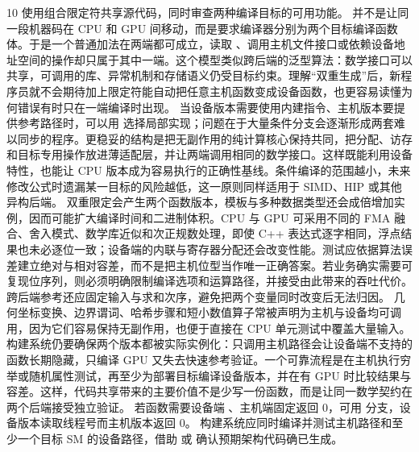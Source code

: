 \begin{solutionexercise}{10}
\conclusionheading 使用组合限定符共享源代码，同时审查两种编译目标的可用功能。
\discussionheading
{}
 并不是让同一段机器码在 CPU 和 GPU 间移动，而是要求编译器分别为两个目标编译函数体。于是一个普通加法在两端都可成立，读取 、调用主机文件接口或依赖设备地址空间的操作却只属于其中一端。这个模型类似跨后端的泛型算法：数学接口可以共享，可调用的库、异常机制和存储语义仍受目标约束。理解“双重生成”后，新程序员就不会期待加上限定符能自动把任意主机函数变成设备函数，也更容易读懂为何错误有时只在一端编译时出现。
当设备版本需要使用内建指令、主机版本要提供参考路径时，可以用  选择局部实现；问题在于大量条件分支会逐渐形成两套难以同步的程序。更稳妥的结构是把无副作用的纯计算核心保持共同，把分配、访存和目标专用操作放进薄适配层，并让两端调用相同的数学接口。这样既能利用设备特性，也能让 CPU 版本成为容易执行的正确性基线。条件编译的范围越小，未来修改公式时遗漏某一目标的风险越低，这一原则同样适用于 SIMD、HIP 或其他异构后端。
双重限定会产生两个函数版本，模板与多种数据类型还会成倍增加实例，因而可能扩大编译时间和二进制体积。CPU 与 GPU 可采用不同的 FMA 融合、舍入模式、数学库近似和次正规数处理，即使 C++ 表达式逐字相同，浮点结果也未必逐位一致；设备端的内联与寄存器分配还会改变性能。测试应依据算法误差建立绝对与相对容差，而不是把主机位型当作唯一正确答案。若业务确实需要可复现位序列，则必须明确限制编译选项和运算路径，并接受由此带来的吞吐代价。跨后端参考还应固定输入与求和次序，避免把两个变量同时改变后无法归因。
几何坐标变换、边界谓词、哈希步骤和短小数值算子常被声明为主机与设备均可调用，因为它们容易保持无副作用，也便于直接在 CPU 单元测试中覆盖大量输入。构建系统仍要确保两个版本都被实际实例化：只调用主机路径会让设备端不支持的函数长期隐藏，只编译 GPU 又失去快速参考验证。一个可靠流程是在主机执行穷举或随机属性测试，再至少为部署目标编译设备版本，并在有 GPU 时比较结果与容差。这样，代码共享带来的主要价值不是少写一份函数，而是让同一数学契约在两个后端接受独立验证。
\variantheading 若函数需要设备端 、主机端固定返回 0，可用  分支，设备版本读取线程号而主机版本返回 0。
\practiceheading 构建系统应同时编译并测试主机路径和至少一个目标 SM 的设备路径，借助  或  确认预期架构代码确已生成。
\end{solutionexercise}

